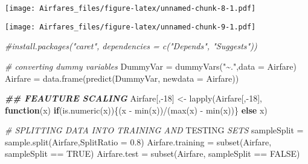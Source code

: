 \documentclass[]{article}
\newenvironment{Shaded}{\begin{snugshade}}{\end{snugshade}}
\newcommand{\AlertTok}[1]{\textcolor[rgb]{0.94,0.16,0.16}{#1}}
\newcommand{\AttributeTok}[1]{\textcolor[rgb]{0.77,0.63,0.00}{#1}}
\newcommand{\CommentTok}[1]{\textcolor[rgb]{0.56,0.35,0.01}{\textit{#1}}}
\newcommand{\ConstantTok}[1]{\textcolor[rgb]{0.00,0.00,0.00}{#1}}
\newcommand{\ControlFlowTok}[1]{\textcolor[rgb]{0.13,0.29,0.53}{\textbf{#1}}}
\newcommand{\DecValTok}[1]{\textcolor[rgb]{0.00,0.00,0.81}{#1}}
\newcommand{\DocumentationTok}[1]{\textcolor[rgb]{0.56,0.35,0.01}{\textbf{\textit{#1}}}}
\newcommand{\FloatTok}[1]{\textcolor[rgb]{0.00,0.00,0.81}{#1}}
\newcommand{\FunctionTok}[1]{\textcolor[rgb]{0.00,0.00,0.00}{#1}}
\newcommand{\NormalTok}[1]{#1}
\newcommand{\OtherTok}[1]{\textcolor[rgb]{0.56,0.35,0.01}{#1}}
\newcommand{\SpecialCharTok}[1]{\textcolor[rgb]{0.00,0.00,0.00}{#1}}
\newcommand{\StringTok}[1]{\textcolor[rgb]{0.31,0.60,0.02}{#1}}
\begin{document}
\texttt{[image: Airfares\_files/figure-latex/unnamed-chunk-8-1.pdf]}

\begin{Shaded}
\end{Shaded}

\texttt{[image: Airfares\_files/figure-latex/unnamed-chunk-9-1.pdf]}

\begin{Shaded}
\begin{Highlighting}[]
\CommentTok{\#install.packages("caret", dependencies = c("Depends", "Suggests"))}

\CommentTok{\# converting dummy variables}
\NormalTok{DummyVar }\OtherTok{=} \FunctionTok{dummyVars}\NormalTok{(}\StringTok{"\textasciitilde{}."}\NormalTok{,}\AttributeTok{data =}\NormalTok{ Airfare)}
\NormalTok{Airfare }\OtherTok{=} \FunctionTok{data.frame}\NormalTok{(}\FunctionTok{predict}\NormalTok{(DummyVar, }\AttributeTok{newdata =}\NormalTok{ Airfare))}

\DocumentationTok{\#\# FEAUTURE SCALING}
\NormalTok{Airfare[,}\SpecialCharTok{{-}}\DecValTok{18}\NormalTok{] }\OtherTok{\textless{}{-}} \FunctionTok{lapply}\NormalTok{(Airfare[,}\SpecialCharTok{{-}}\DecValTok{18}\NormalTok{], }\ControlFlowTok{function}\NormalTok{(x) }\ControlFlowTok{if}\NormalTok{(}\FunctionTok{is.numeric}\NormalTok{(x))\{(x }\SpecialCharTok{{-}} \FunctionTok{min}\NormalTok{(x))}\SpecialCharTok{/}\NormalTok{(}\FunctionTok{max}\NormalTok{(x) }\SpecialCharTok{{-}} \FunctionTok{min}\NormalTok{(x))\} }\ControlFlowTok{else}\NormalTok{ x)}

\CommentTok{\# SPLITTING DATA INTO TRAINING AND }\AlertTok{TESTING}\CommentTok{ SETS}
\NormalTok{sampleSplit }\OtherTok{=} \FunctionTok{sample.split}\NormalTok{(Airfare,}\AttributeTok{SplitRatio =} \FloatTok{0.8}\NormalTok{)}
\NormalTok{Airfare.training }\OtherTok{=} \FunctionTok{subset}\NormalTok{(Airfare, sampleSplit }\SpecialCharTok{==} \ConstantTok{TRUE}\NormalTok{)}
\NormalTok{Airfare.test }\OtherTok{=} \FunctionTok{subset}\NormalTok{(Airfare, sampleSplit }\SpecialCharTok{==} \ConstantTok{FALSE}\NormalTok{)}
\end{Highlighting}
\end{Shaded}
\end{document}
